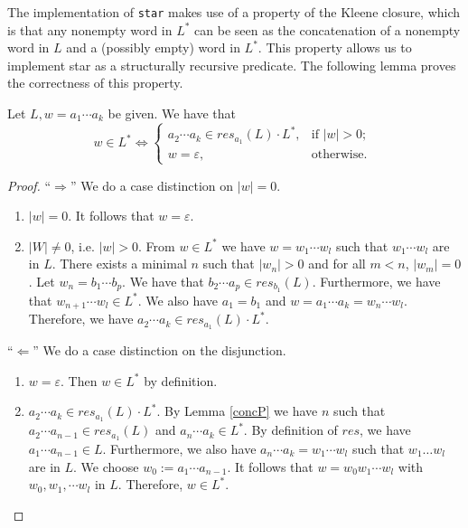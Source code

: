 
    
    The implementation of \lstinline{star} makes use of a property of the Kleene closure, 
    which is that any nonempty word in $L^*$ can be seen as the concatenation of a nonempty word in $L$ and a (possibly empty) word in $L^*$.
    This property allows us to implement star as a structurally recursive predicate.
    The following lemma proves the correctness of this property.

    \begin{lemma}
        \label{starP}
        Let $L, w = a_1 \cdots a_k$ be given. We have that
        \begin{equation*}
            w \in L^*   
            \iff
                \left\{
                    \begin{array}{ll}
                         a_2 \cdots a_k \in res_{a_1}(L) \cdot L^*, & \mbox{if } |w| > 0; \\
                         w = \varepsilon, & \mbox{otherwise. }
                    \end{array}
                \right.
        \end{equation*}
    \end{lemma}
    \begin{proof}
        ``$\Rightarrow$'' 
        We do a case distinction on $|w| = 0$.
        \begin{enumerate}
            \item
                $|w| = 0$. It follows that $w = \varepsilon$.
            \item
                $|W| \neq 0$, i.e. $|w| > 0$.
                From $w \in L^*$ we have $w = w_1 \cdots w_l$ such that $w_1 \cdots w_l$ are in $L$.
                There exists a minimal $n$ such that $|w_n| > 0$ and for all $m < n$, $|w_m| = 0$.
                Let $w_n = b_1 \cdots b_p$. We have that $b_2 \cdots a_p \in res_{b_1}(L)$.
                Furthermore, we have that $w_{n+1} \cdots w_l \in L^*$.
                We also have $a_1 = b_1$ and $w = a_1 \cdots a_k = w_n \cdots w_l$. 
                Therefore, we have $a_2 \cdots a_k \in res_{a_1}(L) \cdot L^*$.
        \end{enumerate}
        ``$\Leftarrow$'' 
        We do a case distinction on the disjunction.
        \begin{enumerate}
            \item
                $w = \varepsilon$. Then $w \in L^*$ by definition.
            \item
                $a_2 \cdots a_k \in res_{a_1}(L) \cdot L^*$. 
                By Lemma \ref{concP} we have $n$ such that $a_2 \cdots a_{n-1} \in res_{a_1}(L)$ and $a_n \cdots a_k \in L^*$.
                By definition of $res$, we have $a_1 \cdots a_{n-1} \in L$.
                Furthermore, we also have $a_n \cdots a_k = w_1 \cdots w_l$ such that $w_1 \ldots w_l$ are in $L$.
                We choose $w_0 := a_1 \cdots a_{n-1}$.
                It follows that $w = w_0 w_1 \cdots w_l$ with $w_0, w_1, \cdots w_l$ in $L$.
                Therefore, $w \in L^*$.
        \end{enumerate}
    \end{proof}

